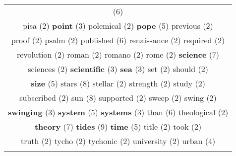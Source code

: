 \documentclass[12pt,a4paper]{article}
\begin{document}
\begin{center}
\begin{tabular}{|c|}
\footnotesize{(6)}  \\ {\footnotesize \textcolor{Verde} {pisa}} \footnotesize{(2)} {\small \textcolor{Laranja} {\bf point}} \footnotesize{(3)} {\footnotesize \textcolor{Verde} {polemical}} \footnotesize{(2)} {\large \textcolor{Roxo} {\bf pope}} \footnotesize{(5)} {\footnotesize \textcolor{Verde} {previous}} \footnotesize{(2)}  \\ {\footnotesize \textcolor{Verde} {proof}} \footnotesize{(2)} {\footnotesize \textcolor{Verde} {psalm}} \footnotesize{(2)} {\Large \textcolor{VermEscuro} {published}} \footnotesize{(6)} {\footnotesize \textcolor{Verde} {renaissance}} \footnotesize{(2)} {\footnotesize \textcolor{Verde} {required}} \footnotesize{(2)}  \\ {\footnotesize \textcolor{Verde} {revolution}} \footnotesize{(2)} {\footnotesize \textcolor{Verde} {roman}} \footnotesize{(2)} {\footnotesize \textcolor{Verde} {romano}} \footnotesize{(2)} {\footnotesize \textcolor{Verde} {rome}} \footnotesize{(2)} {\LARGE \textcolor{Rosa} {\bf science}} \footnotesize{(7)}  \\ {\footnotesize \textcolor{Verde} {sciences}} \footnotesize{(2)} {\small \textcolor{Laranja} {\bf scientific}} \footnotesize{(3)} {\small \textcolor{Laranja} {\bf sea}} \footnotesize{(3)} {\footnotesize \textcolor{Verde} {set}} \footnotesize{(2)} {\footnotesize \textcolor{Verde} {should}} \footnotesize{(2)}  \\ {\large \textcolor{Roxo} {\bf size}} \footnotesize{(5)} {\huge \textcolor{Amarelo} {stars}} \footnotesize{(8)} {\footnotesize \textcolor{Verde} {stellar}} \footnotesize{(2)} {\footnotesize \textcolor{Verde} {strength}} \footnotesize{(2)} {\footnotesize \textcolor{Verde} {study}} \footnotesize{(2)}  \\ {\footnotesize \textcolor{Verde} {subscribed}} \footnotesize{(2)} {\huge \textcolor{Amarelo} {sun}} \footnotesize{(8)} {\footnotesize \textcolor{Verde} {supported}} \footnotesize{(2)} {\footnotesize \textcolor{Verde} {sweep}} \footnotesize{(2)} {\footnotesize \textcolor{Verde} {swing}} \footnotesize{(2)}  \\ {\small \textcolor{Laranja} {\bf swinging}} \footnotesize{(3)} {\large \textcolor{Roxo} {\bf system}} \footnotesize{(5)} {\small \textcolor{Laranja} {\bf systems}} \footnotesize{(3)} {\Large \textcolor{VermEscuro} {than}} \footnotesize{(6)} {\footnotesize \textcolor{Verde} {theological}} \footnotesize{(2)}  \\ {\LARGE \textcolor{Rosa} {\bf theory}} \footnotesize{(7)} {\Huge \textcolor{AzulEscuro} {\bf tides}} \footnotesize{(9)} {\large \textcolor{Roxo} {\bf time}} \footnotesize{(5)} {\footnotesize \textcolor{Verde} {title}} \footnotesize{(2)} {\footnotesize \textcolor{Verde} {took}} \footnotesize{(2)}  \\ {\footnotesize \textcolor{Verde} {truth}} \footnotesize{(2)} {\footnotesize \textcolor{Verde} {tycho}} \footnotesize{(2)} {\footnotesize \textcolor{Verde} {tychonic}} \footnotesize{(2)} {\footnotesize \textcolor{Verde} {university}} \footnotesize{(2)} {\normalsize \textcolor{VerdeLocao} {urban}} \footnotesize{(4)}  \\ {\footnotesize \textcolor{Verde} 
\end{tabular}
\end{center}
\end{document}
